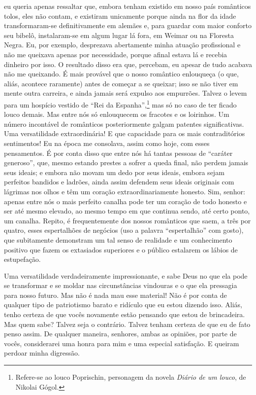 eu queria apenas ressaltar que, embora tenham existido em nosso país românticos
tolos, eles não contam, e existiram unicamente porque ainda na flor da idade
transformaram-se definitivamente em alemães e, para guardar com maior conforto
seu bibelô, instalaram-se em algum lugar lá fora, em Weimar ou na Floresta
Negra. Eu, por exemplo, desprezava abertamente minha atuação profissional e não
me queixava apenas por necessidade, porque afinal estava lá e recebia dinheiro
por isso. O resultado disso era que, percebam, eu apesar de tudo acabava não me
queixando. É mais provável que o nosso romântico enlouqueça (o que, aliás,
acontece raramente) antes de começar a se queixar; isso se não tiver em mente
outra carreira, e ainda jamais será expulso aos empurrões. Talvez o levem para
um hospício vestido de “Rei da Espanha”,\footnote{ Refere-se ao louco
Poprischin, personagem da novela \textit{Diário de um louco}, de Nikolai
Gógol.} mas só no caso de ter ficado louco demais. Mas entre nós só enlouquecem
os fracotes e os loirinhos. Um número incontável de românticos posteriormente
galgam patentes significativas. Uma versatilidade extraordinária! E que
capacidade para os mais contraditórios sentimentos! Eu na época me consolava,
assim como hoje, com esses pensamentos. É por conta disso que entre nós há
tantas pessoas de “caráter generoso”, que, mesmo estando prestes a sofrer a
queda final, não perdem jamais seus ideais; e embora não movam um dedo por seus
ideais, embora sejam perfeitos bandidos e ladrões, ainda assim defendem seus
ideais originais com lágrimas nos olhos e têm um coração extraordinariamente
honesto. Sim, senhor: apenas entre nós o mais perfeito canalha pode ter um
coração de todo honesto e ser até mesmo elevado, ao mesmo tempo em que continua
sendo, até certo ponto, um canalha. Repito, é frequentemente dos nossos
românticos que saem, a três por quatro, esses espertalhões de negócios (uso a
palavra “espertalhão” com gosto), que subitamente demonstram um tal senso de
realidade e um conhecimento positivo que fazem os extasiados superiores e o
público estalarem os lábios de estupefação.

Uma versatilidade verdadeiramente impressionante, e sabe Deus no que ela
pode se transformar e se moldar nas circunstâncias vindouras e o que
ela pressagia para nosso futuro. Mas não é nada mau esse material! Não
é por conta de qualquer tipo de patriotismo barato e ridículo que eu
estou dizendo isso. Aliás, tenho certeza de que vocês novamente estão
pensando que estou de brincadeira. Mas quem sabe? Talvez seja o
contrário. Talvez tenham certeza de que eu de fato penso assim. De
qualquer maneira, senhores, ambas as opiniões, por parte de vocês,
considerarei uma honra para mim e uma especial satisfação. E queiram
perdoar minha digressão.

